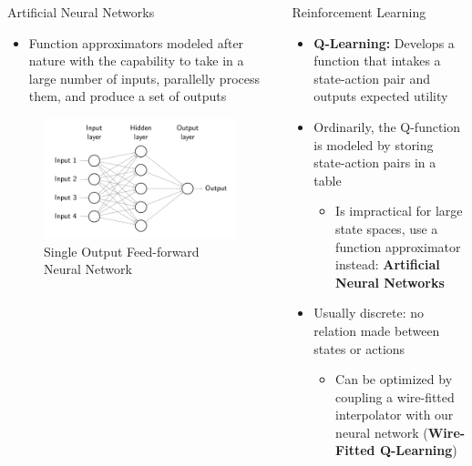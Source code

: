 \documentclass[final]{beamer}
\newlength{\onecolwid}
\newlength{\twocolwid}
\begin{document}
\begin{frame}[t]
\begin{columns}[t]
\begin{column}{\twocolwid}
\begin{columns}[t,totalwidth=\twocolwid]
\begin{column}{\onecolwid}\begin{block}{Artificial Neural Networks}
	\begin{itemize}
		\item Function approximators modeled after nature with the capability to take in a large number of inputs, parallelly process them, and produce a set of outputs
	\end{itemize}
	\vspace{-1.2cm}
	\begin{figure}
		\centering
		\includegraphics[width=.8\linewidth]{Figures/FeedForwardRendered}
		\caption{Single Output Feed-forward Neural Network}
		\label{fig:feedforward}
	\end{figure}
	\vspace{-3cm}
\end{block}\end{column}

\begin{column}{\onecolwid}\begin{block}{Reinforcement Learning}
	\begin{itemize}
		\item \textbf{Q-Learning:} Develops a function that intakes a state-action pair and outputs expected utility
		\item Ordinarily, the Q-function is modeled by storing state-action pairs in a table
		\begin{itemize}
			\item Is impractical for large state spaces, use a function approximator instead: \textbf{Artificial Neural Networks}
		\end{itemize}

		\item Usually discrete: no relation made between states or actions

		\begin{itemize}
			\item Can be optimized by coupling a wire-fitted interpolator with our neural network (\textbf{Wire-Fitted Q-Learning})
		\end{itemize}


\end{itemize}
\end{block}
\end{column}
\end{columns}
\end{column}
\end{columns}
\end{frame}
\end{document}

